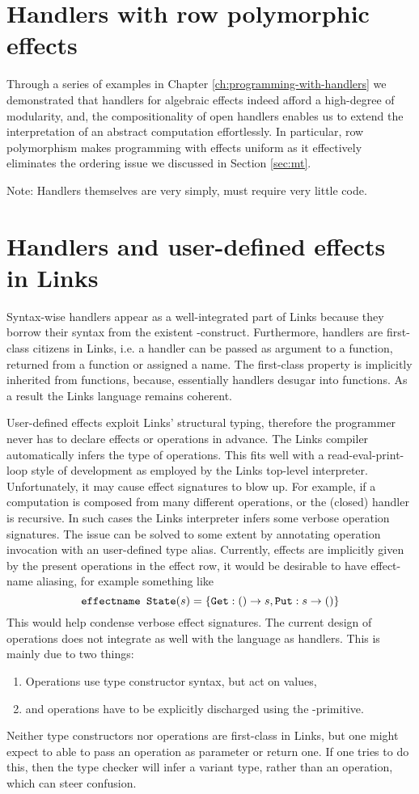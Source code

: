 \section{Handlers with row polymorphic effects}\label{sec:eval-abs}
Through a series of examples in Chapter \ref{ch:programming-with-handlers} we demonstrated that handlers for algebraic effects indeed afford a high-degree of modularity, and, the compositionality of open handlers enables us to extend the interpretation of an abstract computation effortlessly. In particular, row polymorphism makes programming with effects uniform as it effectively eliminates the ordering issue we discussed in Section \ref{sec:mt}.

Note: Handlers themselves are very simply, must require very little code.

\section{Handlers and user-defined effects in Links}
Syntax-wise handlers appear as a well-integrated part of Links because they borrow their syntax from the existent -construct.
Furthermore, handlers are first-class citizens in Links, i.e. a handler can be passed as argument to a function, returned from a function or assigned a name. The first-class property is implicitly inherited from functions, because, essentially handlers desugar into functions.
As a result the Links language remains coherent.

User-defined effects exploit Links' structural typing, therefore the programmer never has to declare effects or operations in advance. The Links compiler automatically infers the type of operations. This fits well with a read-eval-print-loop style of development as employed by the Links top-level interpreter. Unfortunately, it may cause effect signatures to blow up. For example, if a computation is composed from many different operations, or the (closed) handler is recursive. In such cases the Links interpreter infers some verbose operation signatures. The issue can be solved to some extent by annotating operation invocation with an user-defined type alias. Currently, effects are implicitly given by the present operations in the effect row, it would be desirable to have effect-name aliasing, for example something like
\[ \texttt{effectname State}(s) = \{\texttt{Get}: () \to s, \texttt{Put}: s \to ()\} \]
This would help condense verbose effect signatures. The current design of operations does not integrate as well with the language as handlers. This is mainly due to two things:
\begin{enumerate}
  \item Operations use type constructor syntax, but act on values,
  \item and operations have to be explicitly discharged using the -primitive.
\end{enumerate}
Neither type constructors nor operations are first-class in Links, but one might expect to able to pass an operation as parameter or return one. If one tries to do this, then the type checker will infer a variant type, rather than an operation, which can steer confusion.

